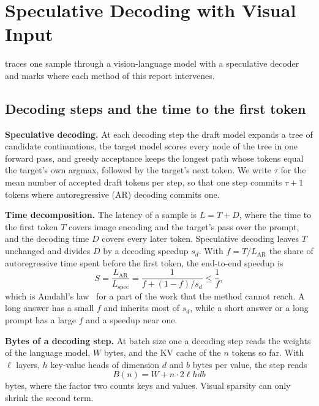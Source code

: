 

\section{Speculative Decoding with Visual Input}
\label{sec:method}

  traces one sample through a vision-language model with a speculative decoder and marks where each method of this report intervenes.

\subsection{Decoding steps and the time to the first token}
\label{sec:time}

\noindent\textbf{Speculative decoding.}
At each decoding step the draft model expands a tree of candidate continuations, the target model scores every node of the tree in one forward pass, and greedy acceptance keeps the longest path whose tokens equal the target's own argmax, followed by the target's next token.
We write $\tau$ for the mean number of accepted draft tokens per step, so that one step commits $\tau + 1$ tokens where autoregressive (AR) decoding commits one.

\noindent\textbf{Time decomposition.}
The latency of a sample is $L = T + D$, where the time to the first token $T$ covers image encoding and the target's pass over the prompt, and the decoding time $D$ covers every later token.
Speculative decoding leaves $T$ unchanged and divides $D$ by a decoding speedup $s_d$.
With $f = T / L_{\mathrm{AR}}$ the share of autoregressive time spent before the first token, the end-to-end speedup is
\begin{equation}
S = \frac{L_{\mathrm{AR}}}{L_{\mathrm{spec}}} = \frac{1}{f + (1 - f) / s_d} \le \frac{1}{f},
\label{eq:amdahl}
\end{equation}
which is Amdahl's law~\cite{amdahl1967validity} for a part of the work that the method cannot reach.
A long answer has a small $f$ and inherits most of $s_d$, while a short answer or a long prompt has a large $f$ and a speedup near one.

\noindent\textbf{Bytes of a decoding step.}
At batch size one a decoding step reads the weights of the language model, $W$ bytes, and the KV cache of the $n$ tokens so far.
With $\ell$ layers, $h$ key-value heads of dimension $d$ and $b$ bytes per value, the step reads
\begin{equation}
B(n) = W + n \cdot 2 \ell h d b
\label{eq:bytes}
\end{equation}
bytes, where the factor two counts keys and values.
Visual sparsity can only shrink the second term.

